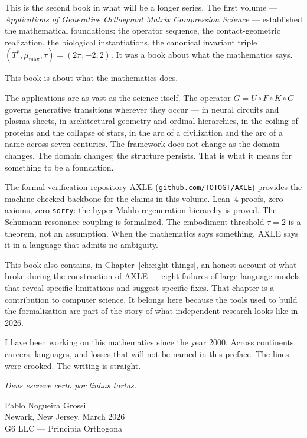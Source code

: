 This is the second book in what will be a longer series. The first
volume --- \textit{Applications of Generative Orthogonal Matrix
Compression Science} --- established the mathematical foundations:
the operator sequence, the contact-geometric realization, the biological
instantiations, the canonical invariant triple $(T^*, \mu_{\max}, \tau)
= (2\pi, -2, 2)$. It was a book about what the mathematics says.

This book is about what the mathematics does.

The applications are as vast as the science itself. The operator
$G = U \circ F \circ K \circ C$ governs generative transitions
wherever they occur --- in neural circuits and plasma sheets, in
architectural geometry and ordinal hierarchies, in the coiling of
proteins and the collapse of stars, in the arc of a civilization
and the arc of a name across seven centuries. The framework does
not change as the domain changes. The domain changes; the structure
persists. That is what it means for something to be a foundation.

The formal verification repository AXLE (\texttt{github.com/TOTOGT/AXLE})
provides the machine-checked backbone for the claims in this volume.
Lean~4 proofs, zero axioms, zero \texttt{sorry}: the hyper-Mahlo
regeneration hierarchy is proved. The Schumann resonance coupling
is formalized. The embodiment threshold $\tau = 2$ is a theorem,
not an assumption. When the mathematics says something, AXLE says
it in a language that admits no ambiguity.

This book also contains, in Chapter~\ref{ch:eight-things}, an honest
account of what broke during the construction of AXLE --- eight
failures of large language models that reveal specific limitations
and suggest specific fixes. That chapter is a contribution to
computer science. It belongs here because the tools used to build
the formalization are part of the story of what independent research
looks like in 2026.

I have been working on this mathematics since the year 2000.
Across continents, careers, languages, and losses that will not
be named in this preface. The lines were crooked. The writing
is straight.

\textit{Deus escreve certo por linhas tortas.}

\bigskip
\begin{flushright}
Pablo Nogueira Grossi\\
Newark, New Jersey, March 2026\\
G6 LLC --- Principia Orthogona
\end{flushright}

